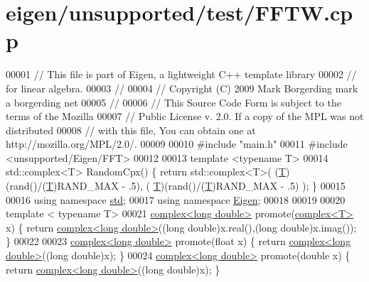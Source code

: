 \hypertarget{eigen_2unsupported_2test_2_f_f_t_w_8cpp_source}{}\section{eigen/unsupported/test/\+F\+F\+TW.cpp}
\label{eigen_2unsupported_2test_2_f_f_t_w_8cpp_source}

\begin{DoxyCode}
00001 \textcolor{comment}{// This file is part of Eigen, a lightweight C++ template library}
00002 \textcolor{comment}{// for linear algebra.}
00003 \textcolor{comment}{//}
00004 \textcolor{comment}{// Copyright (C) 2009 Mark Borgerding mark a borgerding net}
00005 \textcolor{comment}{//}
00006 \textcolor{comment}{// This Source Code Form is subject to the terms of the Mozilla}
00007 \textcolor{comment}{// Public License v. 2.0. If a copy of the MPL was not distributed}
00008 \textcolor{comment}{// with this file, You can obtain one at http://mozilla.org/MPL/2.0/.}
00009 
00010 \textcolor{preprocessor}{#include "main.h"}
00011 \textcolor{preprocessor}{#include <unsupported/Eigen/FFT>}
00012 
00013 \textcolor{keyword}{template} <\textcolor{keyword}{typename} T> 
00014 std::complex<T> RandomCpx() \{ \textcolor{keywordflow}{return} std::complex<T>( (\hyperlink{group___sparse_core___module_class_eigen_1_1_triplet}{T})(rand()/(\hyperlink{group___sparse_core___module_class_eigen_1_1_triplet}{T})RAND\_MAX - .5), (
      \hyperlink{group___sparse_core___module_class_eigen_1_1_triplet}{T})(rand()/(\hyperlink{group___sparse_core___module_class_eigen_1_1_triplet}{T})RAND\_MAX - .5) ); \}
00015 
00016 \textcolor{keyword}{using namespace }\hyperlink{namespacestd}{std};
00017 \textcolor{keyword}{using namespace }\hyperlink{namespace_eigen}{Eigen};
00018 
00019 
00020 \textcolor{keyword}{template} < \textcolor{keyword}{typename} T>
00021 \hyperlink{structcomplex}{complex<long double>}  promote(\hyperlink{structcomplex}{complex<T>} x) \{ \textcolor{keywordflow}{return} 
      \hyperlink{structcomplex}{complex<long double>}((\textcolor{keywordtype}{long} double)x.real(),(\textcolor{keywordtype}{long} double)x.imag()); \}
00022 
00023 \hyperlink{structcomplex}{complex<long double>}  promote(\textcolor{keywordtype}{float} x) \{ \textcolor{keywordflow}{return} 
      \hyperlink{structcomplex}{complex<long double>}((\textcolor{keywordtype}{long} double)x); \}
00024 \hyperlink{structcomplex}{complex<long double>}  promote(\textcolor{keywordtype}{double} x) \{ \textcolor{keywordflow}{return} 
      \hyperlink{structcomplex}{complex<long double>}((\textcolor{keywordtype}{long} double)x); \}

\end{DoxyCode}
